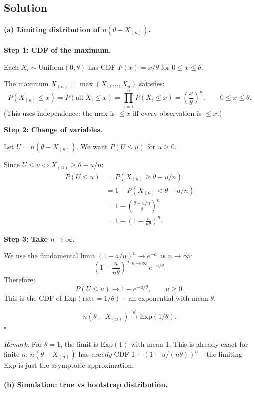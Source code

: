 \documentclass[11pt]{article}
\begin{document}
\subsection*{Solution}

\paragraph{(a) Limiting distribution of $n(\theta - X_{(n)})$.}

\textbf{Step 1: CDF of the maximum.}

Each $X_i \sim \text{Uniform}(0, \theta)$ has CDF $F(x) = x/\theta$ for $0 \leq x \leq \theta$.

The maximum $X_{(n)} = \max(X_1, \ldots, X_n)$ satisfies:
\[
  P(X_{(n)} \leq x) = P(\text{all } X_i \leq x) = \prod_{i=1}^n P(X_i \leq x) = \left(\frac{x}{\theta}\right)^n,
  \qquad 0 \leq x \leq \theta.
\]
(This uses independence: the max is $\leq x$ iff every observation is $\leq x$.)

\textbf{Step 2: Change of variables.}

Let $U = n(\theta - X_{(n)})$. We want $P(U \leq u)$ for $u \geq 0$.

Since $U \leq u \iff X_{(n)} \geq \theta - u/n$:
\begin{align*}
  P(U \leq u)
  &= P(X_{(n)} \geq \theta - u/n) \\
  &= 1 - P(X_{(n)} < \theta - u/n) \\
  &= 1 - \left(\frac{\theta - u/n}{\theta}\right)^n \\
  &= 1 - \left(1 - \frac{u}{n\theta}\right)^n.
\end{align*}

\textbf{Step 3: Take $n \to \infty$.}

We use the fundamental limit $(1 - a/n)^n \to e^{-a}$ as $n \to \infty$:
\[
  \left(1 - \frac{u}{n\theta}\right)^n \xrightarrow{n \to \infty} e^{-u/\theta}.
\]
Therefore:
\[
  P(U \leq u) \to 1 - e^{-u/\theta}, \qquad u \geq 0.
\]
This is the CDF of $\text{Exp}(\text{rate} = 1/\theta)$ -- an exponential with mean $\theta$.

\[
  \boxed{n(\theta - X_{(n)}) \xrightarrow{d} \text{Exp}(1/\theta).}
\]
\hfill$\square$

\textit{Remark:} For $\theta = 1$, the limit is $\text{Exp}(1)$ with mean 1. This is already exact for finite $n$: $n(\theta - X_{(n)})$ has \textit{exactly} CDF $1 - (1 - u/(n\theta))^n$ -- the limiting Exp is just the asymptotic approximation.

\paragraph{(b) Simulation: true vs bootstrap distribution.}
\end{document}

